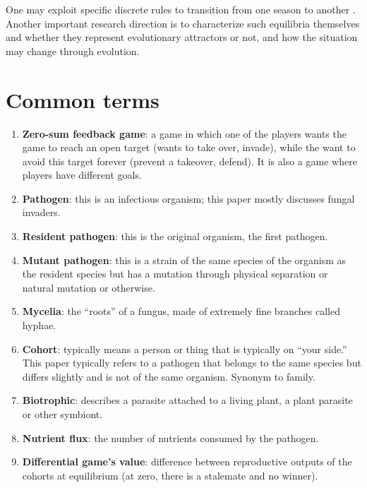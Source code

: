 \documentclass[11pt]{amsart}
\begin{document}
One may exploit specific discrete rules to
transition from one season to another \cite{MailleretLemesle2009,Akhmetzhanov2012}.
Another important research direction is to characterize such equilibria
themselves and whether they represent evolutionary attractors or not, and how the
situation may change through evolution.

\appendix

\section{Common terms}\label{terms}
\begin{enumerate}
    \item\label{term:zerosum} \textbf{Zero-sum feedback game}: a game in which one of the players wants the game to reach an open target (wants to take over, invade), while the want to avoid this target forever (prevent a takeover, defend)\cite{zerosumgame}. It is also a game where players have different goals.
    \item\label{term:pathogen} \textbf{Pathogen}: this is an infectious organism; this paper mostly discusses fungal invaders.
    \item\label{term:resident} \textbf{Resident pathogen}: this is the original organism, the first pathogen.
    \item\label{term:mutant} \textbf{Mutant pathogen}: this is a strain of the same species of the organism as the resident species but has a mutation through physical separation or natural mutation or otherwise.
    \item\label{term:mycelia} \textbf{Mycelia}: the ``roots'' of a fungus, made of extremely fine branches called hyphae. 
    \item\label{term:cohort} \textbf{Cohort}: typically means a person or thing that is typically on ``your side.'' This paper typically refers to a pathogen that belongs to the same species but differs slightly and is not of the same organism. Synonym to family.
    \item\label{term:biotrohpic} \textbf{Biotrophic}: describes a parasite attached to a living plant, a plant parasite or other symbiont. 
    \item\label{term:nutrientflux} \textbf{Nutrient flux}: the number of nutrients consumed by the pathogen.
    \item\label{term:differentialgame} \textbf{Differential game's value}:  difference between reproductive outputs of the cohorts at equilibrium (at zero, there is a stalemate and no winner).

\end{enumerate}
\end{document}
